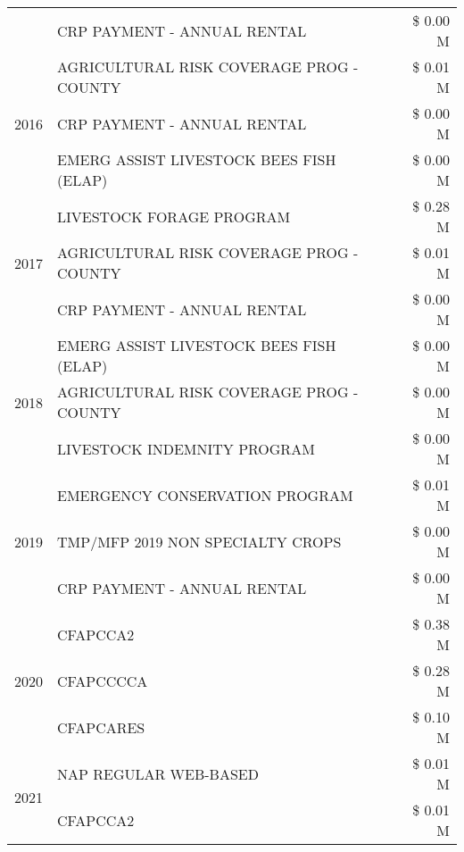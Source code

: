 \begin{tabular}{llr}
 & CRP PAYMENT - ANNUAL RENTAL & \$ 0.00 M \\
\cline{1-3}
\multirow[t]{3}{*}{2016} & AGRICULTURAL RISK COVERAGE PROG - COUNTY & \$ 0.01 M \\
 & CRP PAYMENT - ANNUAL RENTAL & \$ 0.00 M \\
 & EMERG ASSIST LIVESTOCK BEES FISH (ELAP) & \$ 0.00 M \\
\cline{1-3}
\multirow[t]{3}{*}{2017} & LIVESTOCK FORAGE PROGRAM & \$ 0.28 M \\
 & AGRICULTURAL RISK COVERAGE PROG - COUNTY & \$ 0.01 M \\
 & CRP PAYMENT - ANNUAL RENTAL & \$ 0.00 M \\
\cline{1-3}
\multirow[t]{3}{*}{2018} & EMERG ASSIST LIVESTOCK BEES FISH (ELAP) & \$ 0.00 M \\
 & AGRICULTURAL RISK COVERAGE PROG - COUNTY & \$ 0.00 M \\
 & LIVESTOCK INDEMNITY PROGRAM & \$ 0.00 M \\
\cline{1-3}
\multirow[t]{3}{*}{2019} & EMERGENCY CONSERVATION PROGRAM & \$ 0.01 M \\
 & TMP/MFP 2019 NON SPECIALTY CROPS & \$ 0.00 M \\
 & CRP PAYMENT - ANNUAL RENTAL & \$ 0.00 M \\
\cline{1-3}
\multirow[t]{3}{*}{2020} & CFAPCCA2 & \$ 0.38 M \\
 & CFAPCCCCA & \$ 0.28 M \\
 & CFAPCARES & \$ 0.10 M \\
\cline{1-3}
\multirow[t]{2}{*}{2021} & NAP REGULAR WEB-BASED & \$ 0.01 M \\
 & CFAPCCA2 & \$ 0.01 M \\
\cline{1-3}
\bottomrule
\end{tabular}
